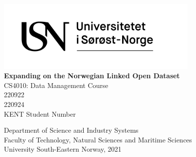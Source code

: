 \thispagestyle{empty}

\begin{center}

\includegraphics[width=10cm]{figures/logos/USN_logo_rgb.png}\\[5pc]

\textbf{\Huge{Expanding on the Norwegian Linked Open Dataset}}\\[0.1pc]

\small{CS4010: Data Management Course}\\[7pc]

\Large{220922}\\
\Large{220924}\\
\Large{KENT Student Number}\\

\vfill

\large{Department of Science and Industry Systems}\\[1pc]
\large{Faculty of Technology, Natural Sciences and Maritime Sciences}\\[1pc]
\large{University South-Eastern Norway, 2021}\\[1pc]

\end{center}
